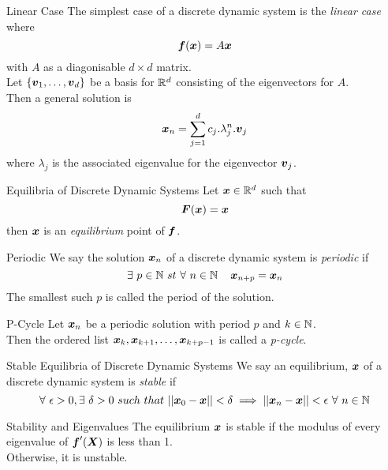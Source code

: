 \documentclass[11pt,a4paper]{article}
\begin{document}
\subtitle{Theorem 17.02 - }{Linear Case}
The simplest case of a discrete dynamic system is the \textit{linear case} where
$$\boldsymbol{f}(\boldsymbol{x}) = A\boldsymbol{x}$$
with $A$ as a diagonisable $d \times d$ matrix.\\
Let $\{\boldsymbol{v}_1, \dots , \boldsymbol{v}_d\}$ be a basis for $\mathbb{R}^d$ consisting of the eigenvectors for $A$.\\
Then a general solution is
$$\boldsymbol{x}_n = \sum_{j=1}^d c_j.\lambda_j^n.\boldsymbol{v}_j$$
where $\lambda_j$ is the associated eigenvalue for the eigenvector $\boldsymbol{v}_j$.\\

\subtitle{Definition 17.03 - }{Equilibria of Discrete Dynamic Systems}
Let $\boldsymbol{x} \in \mathbb{R}^d$ such that
$$\boldsymbol{F}(\boldsymbol{x}) = \boldsymbol{x}$$
then $\boldsymbol{x}$ is an \textit{equilibrium} point of $\boldsymbol{f}$.\\

\subtitle{Definition 17.04 - }{Periodic}
We say the solution $\boldsymbol{x}_n$ of a discrete dynamic system is \textit{periodic} if
$$\exists\ p \in \nat\ st\ \forall\ n \in \nat\,\quad \vect{x}_{n+p} = \vect{x}_n$$
The smallest such $p$ is called the period of the solution.\\

\subtitle{Definition 17.05 - }{P-Cycle}
Let $\boldsymbol{x}_n$ be a periodic solution with period $p$ and $k \in \mathbb{N}$.\\
Then the ordered list $\boldsymbol{x}_k, \boldsymbol{x}_{k+1}, \dots, \boldsymbol{x}_{k+p-1}$ is called a \textit{p-cycle}.\\

\subtitle{Definition 17.06 - }{Stable Equilibria of Discrete Dynamic Systems}
We say an equilibrium, $\boldsymbol{x}$ of a discrete dynamic system is \textit{stable} if
$$\forall\ \epsilon > 0, \exists\ \delta > 0\ such\ that\ ||\vect{x}_0 - \vect{x}|| < \delta \implies ||\vect{x}_n - \vect{x}|| < \epsilon\ \forall\ n \in \nat$$

\subtitle{Proposition 17.07 - }{Stability and Eigenvalues}
The equilibrium $\boldsymbol{x}$ is stable if the modulus of every eigenvalue of $\boldsymbol{f}'(\boldsymbol{X})$ is less than 1.\\
Otherwise, it is unstable.
\end{document}
